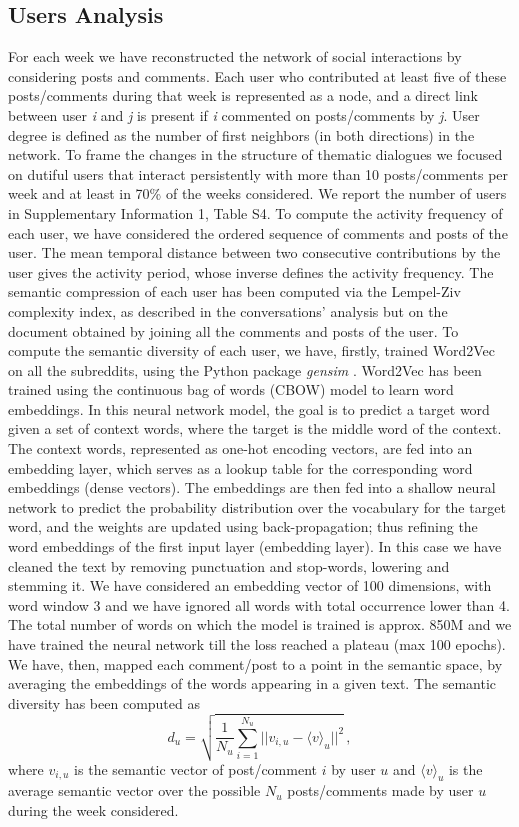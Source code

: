\documentclass[fleqn,10pt]{wlscirep}
\begin{document}
\subsection*{Users Analysis}
%
For each week we have reconstructed the network of social interactions by considering posts and comments. Each user who contributed at least five of these posts/comments during that week is represented as a node, and a direct link between user \emph{i} and \emph{j} is present if \emph{i} commented on posts/comments by \emph{j}. 
User degree is defined as the number of first neighbors (in both directions) in the network.
%
To frame the changes in the structure of thematic dialogues we focused on dutiful users that interact persistently with more than 10 posts/comments per week and at least in 70\% of the weeks considered. We report the number of users in Supplementary Information 1, Table S4.
%
To compute the activity frequency of each user, we have considered the ordered sequence of comments and posts of the user. The mean temporal distance between two consecutive contributions by the user gives the activity period, whose inverse defines the activity frequency.
%
The semantic compression of each user has been computed via the Lempel-Ziv complexity index, as described in the conversations' analysis but on the document obtained by joining all the comments and posts of the user.
%
To compute the semantic diversity of each user, we have, firstly, trained Word2Vec \cite{mikolov2013distributed} on all the subreddits, using the Python package \emph{gensim} \cite{rehurek2011gensim}. 
Word2Vec has been trained using the continuous bag of words (CBOW) model to learn word embeddings. In this neural network model, the goal is to predict a target word given a set of context words, where the target is the middle word of the context. The context words, represented as one-hot encoding vectors, are fed into an embedding layer, which serves as a lookup table for the corresponding word embeddings (dense vectors). The embeddings are then fed into a shallow neural network to predict the probability distribution over the vocabulary for the target word, and the weights are updated using back-propagation; thus refining the word embeddings of the first input layer (embedding layer).
In this case we have cleaned the text by removing punctuation and stop-words, lowering and stemming it. We have considered an embedding vector of 100 dimensions, with word window 3 and we have ignored all words with total occurrence lower than 4. The total number of words on which the model is trained is approx. 850M and we have trained the neural network till the loss reached a plateau (max 100 epochs).
We have, then, mapped each comment/post to a point in the semantic space, by averaging the embeddings of the words appearing in a given text. The semantic diversity has been computed as
\begin{equation}
	d_u = \sqrt{\frac{1}{N_u}\sum_{i=1}^{N_u}||v_{i,u}-\langle v\rangle_{u}||^2}\,,
\end{equation}
where $v_{i,u}$ is the semantic vector of post/comment $i$ by user $u$ and $\langle v\rangle_u$ is the average semantic vector over the possible $N_u$ posts/comments made by user $u$ during the week considered.
\end{document}

